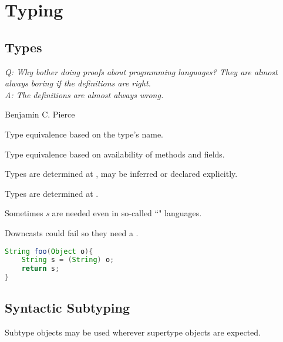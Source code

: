 \documentclass{article}
\begin{document}
\section{Typing}

\subsection{Types}

\epigraph{\itshape Q: Why bother doing proofs about programming languages? They are almost always boring if the definitions are right. \\
A: The definitions are almost always wrong.}{Benjamin C. Pierce }

\begin{definition}
Type equivalence based on the type's name.
\end{definition}

\begin{definition}
Type equivalence based on availability of methods and fields.
\end{definition}

\begin{definition}
Types are determined at \compiletime{}, may be inferred or declared explicitly.
\end{definition}

\begin{definition}
Types are determined at \runtime{}.
\end{definition}

Sometimes \textit{\runtimecheck{}s} are needed even in so-called ``\static{}" languages.

\begin{example}[Downcasts]
Downcasts could fail so they need a \runtimecheck{}.
\begin{lstlisting}[language=Java]
String foo(Object o){
    String s = (String) o;
    return s;
}
\end{lstlisting}
\end{example}

\subsection{Syntactic Subtyping}

\begin{definition}[\subprincip{}]
    Subtype objects may be used wherever supertype objects are expected.
\end{definition}
\end{document}
